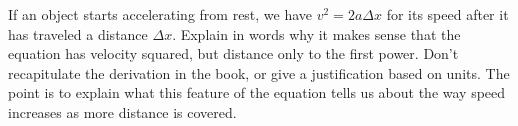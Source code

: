 If an object starts accelerating from rest, we have
$v^2=2a\Delta x$ for its speed after it has traveled a
distance $\Delta x$. Explain in words why it makes sense
that the equation has velocity squared, but distance only to
the first power. Don't recapitulate the derivation in the
book, or give a justification based on units. The point is
to explain what this feature of the equation tells us about
the way speed increases as more distance is covered.
